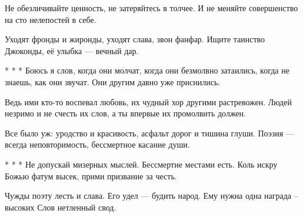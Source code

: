 Не обезличивайте ценность,
не затеряйтесь в толчее.
И не меняйте совершенство
на сто нелепостей в себе.

Уходят фронды и жиронды,
уходят слава, звон фанфар.
Ищите таинство Джоконды,
её улыбка --- вечный дар.

* * *
Боюсь я слов, когда они молчат,
когда они безмолвно затаились,
когда не знаешь, как они звучат.
Они другим давно уже приснились.

Ведь ими кто-то воспевал любовь,
их чудный хор другими растревожен.
Людей незримо и не счесть их слов,
а ты впервые их промолвить должен.

Все было уж: уродство и красивость,
асфальт дорог и тишина глуши.
Поэзия --- всегда неповторимость,
бессмертное касание души.

* * * 
Не допускай мизерных мыслей.
Бессмертие местами есть.
Коль искру Божью фатум высек,
прими призвание за честь.

Чужды поэту лесть и слава.
Его удел --- будить народ.
Ему нужна одна награда –
высоких Слов нетленный свод. 
